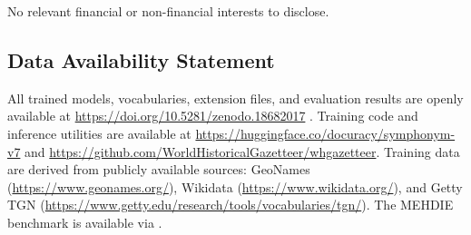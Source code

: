 \documentclass[11pt,a4paper]{article}
\begin{document}
No relevant financial or non-financial interests to disclose.

\subsection*{Data Availability Statement}

All trained models, vocabularies, extension files, and evaluation results are openly available at \url{https://doi.org/10.5281/zenodo.18682017} \citep{symphonym2026zenodo}. Training code and inference utilities are available at \url{https://huggingface.co/docuracy/symphonym-v7} \citep{symphonym2026hf} and \url{https://github.com/WorldHistoricalGazetteer/whgazetteer}. Training data are derived from publicly available sources: GeoNames (\url{https://www.geonames.org/}), Wikidata (\url{https://www.wikidata.org/}), and Getty TGN (\url{https://www.getty.edu/research/tools/vocabularies/tgn/}). The MEHDIE benchmark is available via \citet{mehdie2025}.







\clearpage
\end{document}

